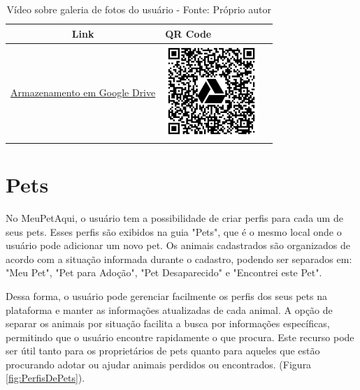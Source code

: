 \begin{table}[htbp]
\centering
\renewcommand{\arraystretch}{1.5}
\begin{tabular}{|c|>{\centering\arraybackslash}m{6cm}|c|}
\hline
\textbf{Link} & \textbf{QR Code} \\
\hline
\href{https://drive.google.com/file/d/1v1G_Ykho823LDGSGFYSppBE6IkCKUW__/view?usp=drive_link}{Armazenamento em Google Drive} & \includegraphics[width=3.5cm]{arquivos/ImgLinks/galeriaDeFotos.png} \\
\hline
\end{tabular}
\caption*{Vídeo sobre galeria de fotos do usuário - Fonte: Próprio autor}
\end{table}

\newpage
\section{Pets}
No MeuPetAqui, o usuário tem a possibilidade de criar perfis para cada um de seus pets. Esses perfis são exibidos na guia "Pets", que é o mesmo local onde o usuário pode adicionar um novo pet. Os animais cadastrados são organizados de acordo com a situação informada durante o cadastro, podendo ser separados em: "Meu Pet", "Pet para Adoção", "Pet Desaparecido" e "Encontrei este Pet".

Dessa forma, o usuário pode gerenciar facilmente os perfis dos seus pets na plataforma e manter as informações atualizadas de cada animal. A opção de separar os animais por situação facilita a busca por informações específicas, permitindo que o usuário encontre rapidamente o que procura. Este recurso pode ser útil tanto para os proprietários de pets quanto para aqueles que estão procurando adotar ou ajudar animais perdidos ou encontrados. (Figura \ref{fig:PerfisDePets}).

